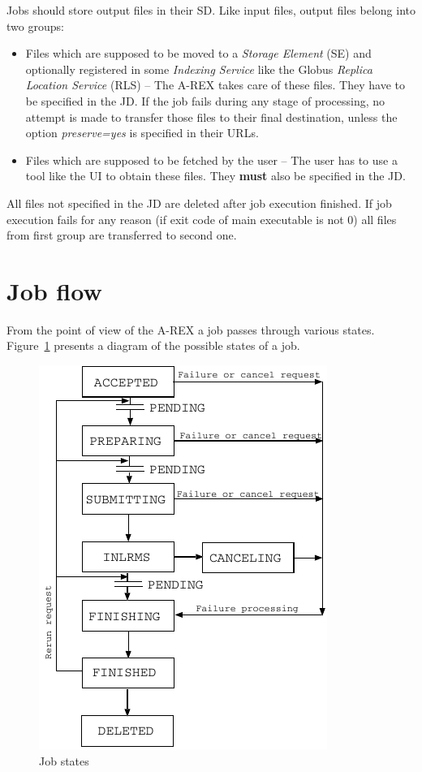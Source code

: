 \documentclass{article}                            %
\begin{document}
Jobs should store output files in their SD. Like input files, output
files belong into two groups:

\begin{itemize}
\item Files which are supposed to be moved to a \emph{Storage Element} (SE)
and optionally registered in some \emph{Indexing Service} like the
Globus \emph{Replica Location Service} (RLS) -- The A-REX takes care
of these files. They have to be specified in the JD. If the job fails
during any stage of processing, no attempt is made to transfer those
files to their final destination, unless the option \emph{preserve=yes}
is specified in their URLs.
\item Files which are supposed to be fetched by the user -- The user has
to use a tool like the UI to obtain these files. They \textbf{must}
also be specified in the JD.
\end{itemize}
All files not specified in the JD are deleted after job execution
finished. If job execution fails for any reason (if exit code of main
executable is not 0) all files from first group are transferred to
second one.

\section{Job flow\label{Section:Job Flow}}

From the point of view of the A-REX a job passes through various states.
Figure~\ref{job states diagram} presents a diagram of the possible
states of a job.%

\begin{figure}[th]
\centering \includegraphics{pic1.pdf}
\caption{\label{job states diagram}Job states}
\end{figure}
\end{document}
